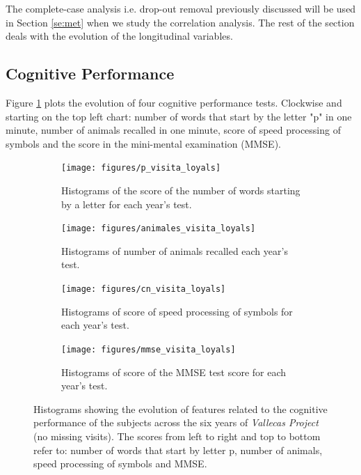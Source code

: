\documentclass[11pt]{article}
\theoremstyle{definition}
\theoremstyle{remark}
\begin{document}
The complete-case analysis i.e. drop-out removal previously discussed will be used in Section \ref{se:met} when we study the correlation analysis. 
The rest of the section deals with the evolution of the longitudinal variables. 


\subsection{Cognitive Performance}
\label{sse:cogper}

Figure \ref{fig:cogperyears} plots the evolution of four cognitive performance tests. Clockwise and starting on  the top left chart: number of words that start by the letter "p" in one minute, number of animals recalled in one minute, score of speed processing of symbols and the score in the mini-mental examination (MMSE).

\begin{figure}[H]
    \centering
    \begin{subfigure}[t]{0.4\textwidth}
        \centering
        \texttt{[image: figures/p\_visita\_loyals]}
        \caption{Histograms of the score of the number of words starting by a letter for each year's test.}
    \end{subfigure}
    \hfill
    \begin{subfigure}[t]{0.4\textwidth}
        \centering
        \texttt{[image: figures/animales\_visita\_loyals]}
        \caption{Histograms of number of animals recalled each year's test.}
    \end{subfigure}%
    
     \begin{subfigure}[t]{0.4\textwidth}
        \centering
        \texttt{[image: figures/cn\_visita\_loyals]}
        \caption{Histograms of score of speed processing of symbols for each year's test.}
    \end{subfigure}
    \hfill
    \begin{subfigure}[t]{0.4\textwidth}
        \centering
        \texttt{[image: figures/mmse\_visita\_loyals]}
        \caption{Histograms of score of the MMSE test score for each year's test.}
    \end{subfigure}%
    \caption{Histograms showing the evolution of features related to the cognitive performance of the subjects across the six years of \emph{Vallecas Project} (no missing visits). The scores from left to right and top to bottom refer to: number of words that start by letter p, number of animals, speed processing of symbols and MMSE.}
    \label{fig:cogperyears}
\end{figure}
\end{document}

